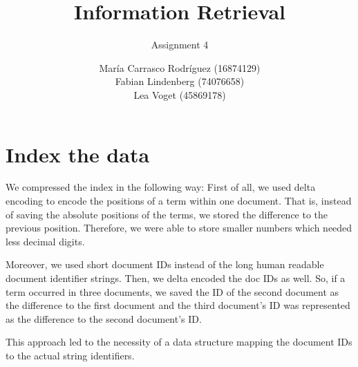 \documentclass[a4paper,11pt,oneside]{book}
\title{Information Retrieval }
\subtitle{Assignment 4}
\author{ María Carrasco Rodríguez (16874129) \\
		Fabian Lindenberg (74076658) \\
		Lea Voget (45869178)}
\begin{document}
\kostspieligmaketitle


\setcounter{chapter}{2}
\chapter{Index the data}

We compressed the index in the following way: First of all, we used delta encoding to encode the positions of a term within one document. That is, instead of saving the absolute positions of the terms, we stored the difference to the previous position. Therefore, we were able to store smaller numbers which needed less decimal digits.

Moreover, we used short document IDs instead of the long human readable document identifier strings. Then, we delta encoded the doc IDs as well. So, if a term occurred in three documents, we saved the ID of the second document as the difference to the first document and the third document's ID was represented as the difference to the second document's ID.

This approach led to the necessity of a data structure mapping the document IDs to the actual string identifiers.
\end{document}
